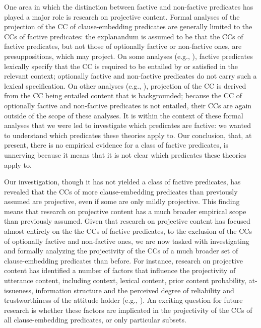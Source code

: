 \documentclass[11pt,fleqn]{article}
\newcommand{\6}{\mbox{$[\hspace*{-.6mm}[$}}
\newcommand{\9}{\mbox{$]\hspace*{-.6mm}]$}}
\begin{document}
{One area in which the distinction between factive and non-factive predicates has played a major role is research on projective content. Formal analyses of the projection of the CC of clause-embedding predicates are generally limited to the CCs of factive predicates: the explanandum is assumed to be that the CCs of factive predicates, but not those of optionally factive or non-factive ones, are presuppositions, which may project. On some analyses (e.g., \citealt{heim83,vds92}), factive predicates lexically specify that the CC is required to be entailed by or satisfied in the relevant context; optionally factive and non-factive predicates do not carry such a lexical specification. On other analyses (e.g., \citealt{abrusan2011,abrusan2016,romoli2015,best-question}), projection of the CC is derived from the CC being entailed content that is backgrounded; because the CC of optionally factive and non-factive predicates is not entailed, their CCs are again outside of the scope of these analyses. It is within the context of these formal analyses that we were led to investigate which predicates are factive: we wanted to understand which predicates these theories apply to. Our conclusion, that, at present, there is no empirical evidence for a class of factive predicates, is unnerving because it means that it is not clear which predicates these theories apply to.

Our investigation, though it has not yielded a class of factive predicates, has revealed that the CCs of more clause-embedding predicates than previously assumed are projective, even if some are only mildly projective. This finding means that research on projective content has a much broader empirical scope than previously assumed. Given that research on projective content has focused almost entirely on the the CCs of factive predicates, to the exclusion of the CCs of optionally factive and non-factive ones, we are now tasked with investigating and formally analyzing the projectivity of the CCs of a much broader set of clause-embedding predicates than before. For instance, research on projective content has identified a number of factors that influence the projectivity of utterance content, including context, lexical content, prior content probability, at-issueness, information structure and the perceived degree of reliability and trustworthiness of the attitude holder (e.g., \citealt{gazdar79a,gazdar79b,beaver-belly,schlenker10,brst-salt10,best-question,abrusan2011,abrusan2016,anand-hacquard2014,cummins-rohde2015,djaerv-bacovcin-salt27,tonhauser-salt26,tonhauser-guarani-variability,tbd-variability,tonhauser-etal-sub23}). An exciting question for future research is whether these factors are implicated in the projectivity of the CCs of all clause-embedding predicates, or only particular subsets. 

}
\end{document}
